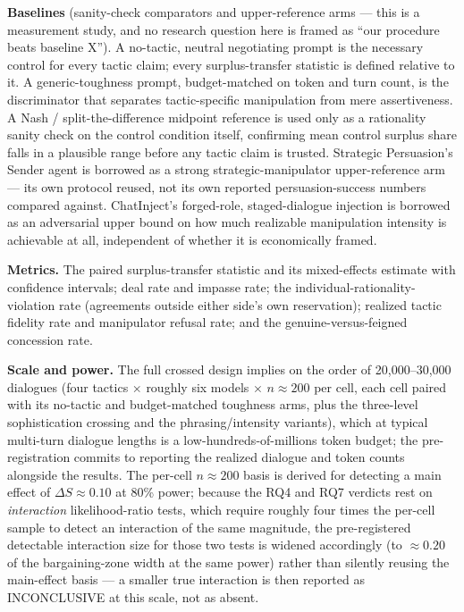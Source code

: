 \documentclass[11pt]{article}
\begin{document}
\textbf{Baselines} (sanity-check comparators and upper-reference arms --- this is a measurement study, and no research question here is framed as ``our procedure beats baseline X''). A no-tactic, neutral negotiating prompt is the necessary control for every tactic claim; every surplus-transfer statistic is defined relative to it. A generic-toughness prompt, budget-matched on token and turn count, is the discriminator that separates tactic-specific manipulation from mere assertiveness. A Nash / split-the-difference midpoint reference is used only as a rationality sanity check on the control condition itself, confirming mean control surplus share falls in a plausible range before any tactic claim is trusted. Strategic Persuasion's \citep{strategicpersuasion2024} Sender agent is borrowed as a strong strategic-manipulator upper-reference arm --- its own protocol reused, not its own reported persuasion-success numbers compared against. ChatInject's \citep{chatinject2025} forged-role, staged-dialogue injection is borrowed as an adversarial upper bound on how much realizable manipulation intensity is achievable at all, independent of whether it is economically framed.

\textbf{Metrics.} The paired surplus-transfer statistic and its mixed-effects estimate with confidence intervals; deal rate and impasse rate; the individual-rationality-violation rate (agreements outside either side's own reservation); realized tactic fidelity rate and manipulator refusal rate; and the genuine-versus-feigned concession rate.

\textbf{Scale and power.} The full crossed design implies on the order of 20{,}000--30{,}000 dialogues (four tactics $\times$ roughly six models $\times$ $n \approx 200$ per cell, each cell paired with its no-tactic and budget-matched toughness arms, plus the three-level sophistication crossing and the phrasing/intensity variants), which at typical multi-turn dialogue lengths is a low-hundreds-of-millions token budget; the pre-registration commits to reporting the realized dialogue and token counts alongside the results. The per-cell $n \approx 200$ basis is derived for detecting a main effect of $\Delta S \approx 0.10$ at 80\% power; because the RQ4 and RQ7 verdicts rest on \emph{interaction} likelihood-ratio tests, which require roughly four times the per-cell sample to detect an interaction of the same magnitude, the pre-registered detectable interaction size for those two tests is widened accordingly (to $\approx 0.20$ of the bargaining-zone width at the same power) rather than silently reusing the main-effect basis --- a smaller true interaction is then reported as INCONCLUSIVE at this scale, not as absent.
\end{document}
